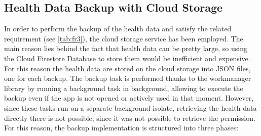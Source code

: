 \subsection{Health Data Backup with Cloud Storage}
In order to perform the backup of the health data and satisfy the related requirement (see \cref{tab:fr3}), the cloud storage service has been employed. The main reason lies behind the fact that health data can be pretty large, so using the Cloud Firestore Database to store them would be inefficient and expensive. For this reason the health data are stored on the cloud storage into JSON files, one for each backup. The backup task is performed thanks to the workmanager library by running a background task in background, allowing to execute the backup even if the app is not opened or actively used in that moment. However, since these tasks run on a separate background isolate, retrieving the health data directly there is not possible, since it was not possible to retrieve the permission.
\newpage For this reason, the backup implementation is structured into three phases:
